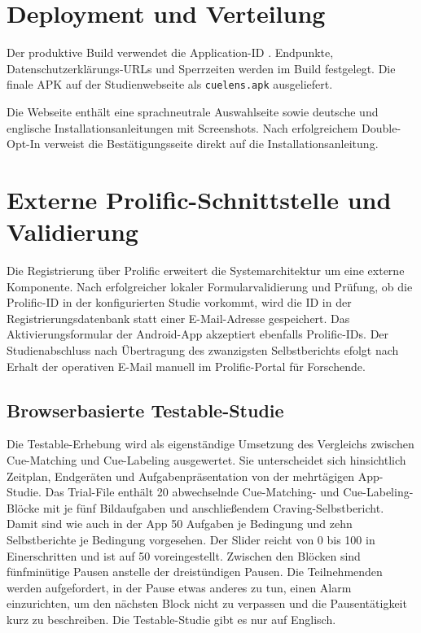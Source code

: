 \section{Deployment und Verteilung}
Der produktive Build verwendet die Application-ID . Endpunkte, Datenschutzerklärungs-URLs und Sperrzeiten werden im Build festgelegt. Die finale APK auf der Studienwebseite als \texttt{cuelens.apk} ausgeliefert.

Die Webseite enthält eine sprachneutrale Auswahlseite sowie deutsche und englische Installationsanleitungen mit Screenshots. Nach erfolgreichem Double-Opt-In verweist die Bestätigungsseite direkt auf die Installationsanleitung.

\section{Externe Prolific-Schnittstelle und Validierung}

Die Registrierung über Prolific erweitert die Systemarchitektur um eine externe Komponente. Nach erfolgreicher lokaler Formularvalidierung und Prüfung, ob die Prolific-ID in der konfigurierten Studie vorkommt, wird die ID in der Registrierungsdatenbank statt einer E-Mail-Adresse gespeichert. Das Aktivierungsformular der Android-App akzeptiert ebenfalls Prolific-IDs. Der Studienabschluss nach Übertragung des zwanzigsten Selbstberichts efolgt nach Erhalt der operativen E-Mail manuell im Prolific-Portal für Forschende.

\begin{neu}
\section{Browserbasierte Testable-Studie}

Die Testable-Erhebung wird als eigenständige Umsetzung des Vergleichs zwischen Cue-Matching und Cue-Labeling ausgewertet. Sie unterscheidet sich hinsichtlich Zeitplan, Endgeräten und Aufgabenpräsentation von der mehrtägigen App-Studie. Das Trial-File enthält 20 abwechselnde Cue-Matching- und Cue-Labeling-Blöcke mit je fünf Bildaufgaben und anschließendem Craving-Selbstbericht. Damit sind wie auch in der App 50 Aufgaben je Bedingung und zehn Selbstberichte je Bedingung vorgesehen. Der Slider reicht von 0 bis 100 in Einerschritten und ist auf 50 voreingestellt. Zwischen den Blöcken sind fünfminütige Pausen anstelle der dreistündigen Pausen. Die Teilnehmenden werden aufgefordert, in der Pause etwas anderes zu tun, einen Alarm einzurichten, um den nächsten Block nicht zu verpassen und die Pausentätigkeit kurz zu beschreiben. Die Testable-Studie gibt es nur auf Englisch.
\end{neu}
